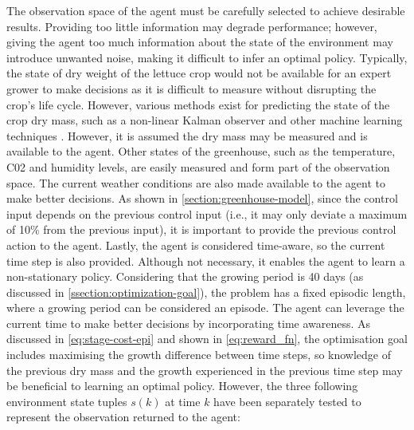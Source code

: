 The observation space of the agent must be carefully selected to achieve desirable results. Providing too little information may degrade performance; however, giving the agent too much information about the state of the environment may introduce unwanted noise, making it difficult to infer an optimal policy. Typically, the state of dry weight of the lettuce crop would not be available for an expert grower to make decisions as it is difficult to measure without disrupting the crop’s life cycle. However, various methods exist for predicting the state of the crop dry mass, such as a non-linear Kalman observer and other machine learning techniques \cite{gongDeepLearningBased2021}. However, it is assumed the dry mass may be measured and is available to the agent. Other states of the greenhouse, such as the temperature, C02 and humidity levels, are easily measured and form part of the observation space. The current weather conditions are also made available to the agent to make better decisions. As shown in \autoref{section:greenhouse-model}, since the control input depends on the previous control input (i.e., it may only deviate a maximum of 10\% from the previous input), it is important to provide the previous control action to the agent. Lastly, the agent is considered time-aware, so the current time step is also provided. Although not necessary, it enables the agent to learn a non-stationary policy. Considering that the growing period is 40 days (as discussed in \autoref{ssection:optimization-goal}), the problem has a fixed episodic length, where a growing period can be considered an episode. The agent can leverage the current time to make better decisions by incorporating time awareness. As discussed in \autoref{eq:stage-cost-epi} and shown in \autoref{eq:reward_fn}, the optimisation goal includes maximising the growth difference between time steps, so knowledge of the previous dry mass and the growth experienced in the previous time step may be beneficial to learning an optimal policy. However, the three following environment state tuples $s(k)$ at time $k$ have been separately tested to represent the observation returned to the agent:



